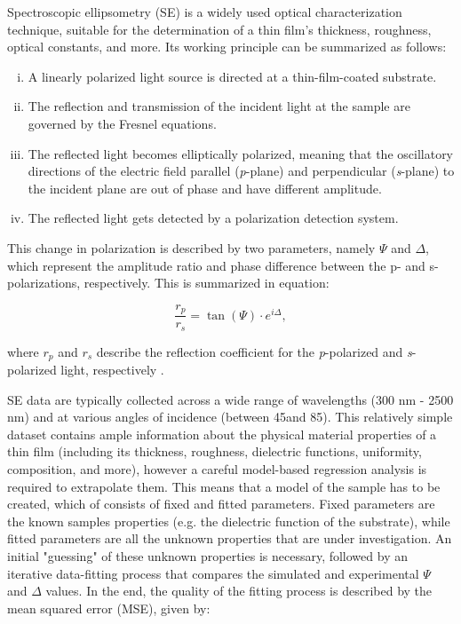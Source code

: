 Spectroscopic ellipsometry (SE) is a widely used optical characterization technique, suitable for the determination of a thin film's thickness, roughness, optical constants, and more. Its working principle can be summarized as follows: 

\begin{enumerate}[i.]
  \item A linearly polarized light source is directed at a thin-film-coated substrate.
  \item The reflection and transmission of the incident light at the sample are governed by the Fresnel equations.
  \item The reflected light becomes elliptically polarized, meaning that the oscillatory directions of the electric field parallel (\textit{p}-plane) and perpendicular (\textit{s}-plane) to the incident plane are out of phase and have different amplitude.
  \item The reflected light gets detected by a polarization detection system.
\end{enumerate}

This change in polarization is described by two parameters, namely $\Psi$ and $\Delta$, which represent the amplitude ratio and phase difference between the p- and s-polarizations, respectively. This is summarized in equation: 

\begin{equation}
\frac{r_p}{r_s} = \tan(\Psi) \cdot e^{i\Delta},
\label{eq:ellipsometry}
\end{equation}

where $r_p$ and $r_s$ describe the reflection coefficient for the \textit{p}-polarized and \textit{s}-polarized light, respectively \cite{Fujiwara2018SpectroscopicCharacterization}.

SE data are typically collected across a wide range of wavelengths (300 nm - 2500 nm) and at various angles of incidence (between 45\degree and 85\degree). This relatively simple dataset contains ample information about the physical material properties of a thin film (including its thickness, roughness, dielectric functions, uniformity, composition, and more), however a careful model-based regression analysis is required to extrapolate them. This means that a model of the sample has to be created, which of consists of fixed and fitted parameters. Fixed parameters are the known samples properties (e.g. the dielectric function of the substrate), while fitted parameters are all the unknown properties that are under investigation. An initial "guessing" of these unknown properties is necessary, followed by an iterative data-fitting process that compares the simulated and experimental $\Psi$ and $\Delta$ values. In the end, the quality of the fitting process is described by the mean squared error (MSE), given by: 


